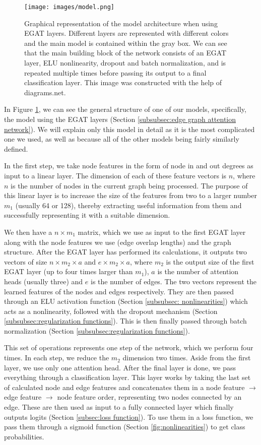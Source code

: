 \documentclass[times, utf8, diplomski, english]{fer_eng}
\begin{document}
\begin{figure}
	\centering
	\texttt{[image: images/model.png]}
	\caption[Model]{Graphical representation of the model architecture when using EGAT layers. Different layers are represented with different colors and the main model is contained within the gray box. We can see that the main building block of the network consists of an EGAT layer, ELU nonlinearity, dropout and batch normalization, and is repeated multiple times before passing its output to a final classification layer. This image was constructed with the help of diagrams.net\footnotemark{}.}
	\label{fig:model}
\end{figure}

In Figure \ref{fig:model}, we can see the general structure of one of our models, specifically, the model using the EGAT layers (Section \ref{subsubsec:edge graph attention network}). We will explain only this model in detail as it is the most complicated one we used, as well as because all of the other models being fairly similarly defined.

In the first step, we take node features in the form of node in and out degrees as input to a linear layer. The dimension of each of these feature vectors is $n$, where $n$ is the number of nodes in the current graph being processed. The purpose of this linear layer is to increase the size of the features from two to a larger number $m_1$ (usually 64 or 128), thereby extracting useful information from them and successfully representing it with a suitable dimension.

We then have a $n \times m_1$ matrix, which we use as input to the first EGAT layer along with the node features we use (edge overlap lengths) and the graph structure. After the EGAT layer has performed its calculations, it outputs two vectors of size $n \times m_2 \times a$ and $e \times m_2 \times a$, where $m_2$ is the output size of the first EGAT layer (up to four times larger than $m_1$), $a$ is the number of attention heads (usually three) and $e$ is the number of edges. The two vectors represent the learned features of the nodes and edges respectively. They are then passed through an ELU activation function (Section \ref{subsubsec: nonlinearities}) which acts as a nonlinearity, followed with the dropout mechanism (Section \ref{subsubsec:regularization functions}). This is then finally passed through batch normalization (Section \ref{subsubsec:regularization functions}).

This set of operations represents one step of the network, which we perform four times. In each step, we reduce the $m_2$ dimension two times. Aside from the first layer, we use only one attention head. After the final layer is done, we pass everything through a classification layer. This layer works by taking the last set of calculated node and edge features and concatenates them in a node feature $\rightarrow$ edge feature $\rightarrow$ node feature order, representing two nodes connected by an edge. These are then used as input to a fully connected layer which finally outputs logits (Section \ref{subsec:loss function}). To use them in a loss function, we pass them through a sigmoid function (Section \ref{fig:nonlinearities}) to get class probabilities.
\end{document}
